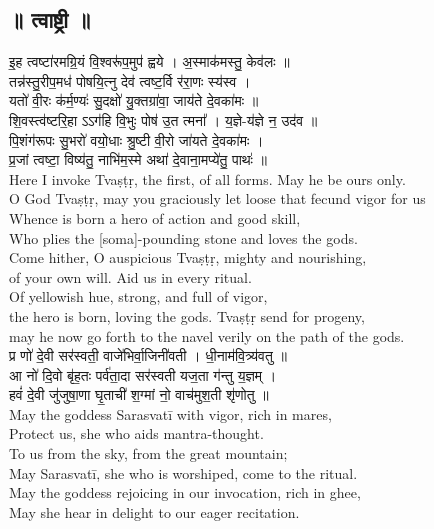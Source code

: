 \documentclass[11pt]{article}
\begin{document}
\begin{center}
	\section{{\Large\skts ॥ त्वाष्ट्री ॥}}
\end{center}
\begin{adjustwidth}{6em}{.2em}
{\large\skts\color{deepblue}
इ॒ह त्वष्टा॑रमग्रि॒यं वि॒श्वरू॑प॒मुप॑ ह्वये । अ॒स्माक॑मस्तु॒ केव॑लः ॥\\ 
तन्न॑स्तु॒रीप॒मध॑ पोषयि॒त्नु देव॑ त्वष्ट॒र्वि र॑रा॒णः स्य॑स्व ।\\
यतो॑ वी॒रः क॑र्म॒ण्यः॑ सु॒दक्षो॑ यु॒क्तग्रा॑वा॒ जाय॑ते दे॒वका॑मः ॥\\
शि॒वस्त्व॑ष्टरि॒हा ऽऽग॑हि वि॒भुः पोष॑ उ॒त त्मना᳚ । य॒ज्ञे-य॑ज्ञे न॒ उद॑व ॥\\
पि॒शंग॑रूपः सु॒भरो॑ वयो॒धाः श्रु॒ष्टी वी॒रो जा॑यते दे॒वका॑मः ।\\
प्र॒जां त्वष्टा॒ विष्य॑तु॒ नाभि॑म॒स्मे अथा॑ दे॒वाना॒मप्ये॑तु॒ पाथः॑ ॥}\\[5pt]
Here I invoke Tvaṣṭṛ, the first, of all forms. May he be ours only.\\
O God Tvaṣṭṛ, may you graciously let loose that fecund vigor for us \\
Whence is born a hero of action and good skill,\\
Who plies the [soma]-pounding stone and loves the gods.\\
Come hither, O auspicious Tvaṣṭṛ, mighty and nourishing,\\
of your own will. Aid us in every ritual.\\
Of yellowish hue, strong, and full of vigor,\\ 
the hero is born, loving the gods. Tvaṣṭṛ send for progeny,\\
may he now go forth to the navel verily on the path of the gods.\\[10pt]

{\large\skts\color{deepblue}
प्र णो॑ दे॒वी सर॑स्वती॒ वाजे॑भिर्वा॒जिनी॑वती । धी॒नाम॑वि॒त्र्य॑वतु ॥\\
आ नो॑ दि॒वो बृ॑ह॒तः पर्व॑ता॒दा सर॑स्वती यज॒ता ग॑न्तु य॒ज्ञम् ।\\
हवं॑ दे॒वी जु॑जुषा॒णा घृ॒ताची॑ श॒ग्मां नो॒ वाच॑मुश॒ती श‍ृ॑णोतु ॥}\\[5pt]
May the goddess Sarasvatī with vigor, rich in mares,\\
Protect us, she who aids mantra-thought.\\
To us from the sky, from the great mountain;\\
May Sarasvatī, she who is worshiped, come to the ritual.\\
May the goddess rejoicing in our invocation, rich in ghee,\\
May she hear in delight to our eager recitation.\\[10pt]


\end{adjustwidth}
\end{document}
